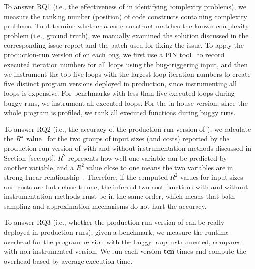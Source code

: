 To answer RQ1 (i.e., the effectiveness of  \Tool in identifying
complexity problems), we measure the ranking number (position) of code
constructs containing complexity problems. 
To determine whether a code construct matches
the known complexity problem (i.e., ground truth), 
we manually examined the solution discussed 
in the corresponding issue 
report and the patch used for fixing the issue. 
To apply the production-run version of \Tool on each bug,
we first use a PIN tool~\cite{pin} to record executed iteration 
numbers for all loops using the bug-triggering input,
and then we instrument the top five loops with the largest loop 
iteration numbers to create five distinct program versions
deployed in production, 
since instrumenting all loops is expensive. 
For benchmarks with less than five executed 
loops during buggy runs, 
we instrument all executed loops.  
For the in-house version, since the whole program is profiled, 
we rank all executed functions during buggy runs. 


To answer RQ2 (i.e., the accuracy of the production-run version of \Tool),
we calculate the $R^2$ value~\cite{rsquare} 
for the two groups of input sizes (and costs) reported by 
the production-run version of \Tool with and without 
instrumentation methods discussed in Section~\ref{sec:opt}.
$R^2$ represents how well one variable can be predicted by another variable,
and a $R^2$ value close to one means the two variables are 
in strong linear relationship~\cite{rsquare-value}.
Therefore, if the computed $R^2$ values for input sizes and costs
are both close to one,
the inferred two cost functions with and without instrumentation 
methods must be in the same order, 
which means that both sampling and approximation mechanisms 
do not hurt the accuracy. 



To answer RQ3 (i.e., whether the production-run version of \Tool 
can be really deployed in production runs), given a benchmark,
we measure the runtime overhead for the program version 
with the buggy loop instrumented, compared with non-instrumented version. 
We run each version \textbf{ten} times and compute the overhead based 
by average execution time. 



